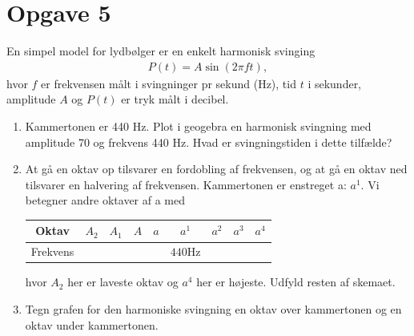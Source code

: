 \documentclass[12pt]{article}
\begin{document}
\section*{Opgave 5}
En simpel model for lydbølger er en enkelt harmonisk svinging
\begin{align*}
P(t) = A\sin(2\pi f t),
\end{align*}
hvor $f$ er frekvensen målt i svingninger pr sekund (Hz), tid $t$ i sekunder, amplitude $A$ og $P(t)$ er tryk målt i decibel. 
\begin{enumerate}[label=\roman*)]
\item Kammertonen er 440 Hz. Plot i geogebra en harmonisk svingning med amplitude 70 og frekvens 440 Hz. Hvad er svingningstiden i dette tilfælde?
\item At gå en oktav op tilsvarer en fordobling af frekvensen, og at gå en oktav ned tilsvarer en halvering af frekvensen. Kammertonen er enstreget a: $a^1$. Vi betegner andre oktaver af a med
\begin{center}
\begin{tabular}{c|c|c|c|c|c|c|c|c}
Oktav & $A_2$ & $A_1$ & $A$ & $a$ & $a^1$ & $a^2$ & $a^3$ & $a^4$ \\
\hline
Frekvens&&&&&$440$Hz&&&
\end{tabular}
\end{center}
hvor $A_2$ her er laveste oktav og $a^4$ her er højeste. Udfyld resten af skemaet. 
\item Tegn grafen for den harmoniske svingning en oktav over kammertonen og en oktav under kammertonen. 
\end{enumerate}
\end{document}
